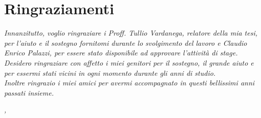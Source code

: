 
\cleardoublepage
{}
{}

\begingroup
\let\clearpage\relax
\let\cleardoublepage\relax
\let\cleardoublepage\relax

\chapter*{Ringraziamenti}

\noindent \textit{Innanzitutto, voglio ringraziare i Proff. Tullio Vardanega, relatore della mia tesi, per l'aiuto e il sostegno fornitomi durante lo svolgimento del lavoro e Claudio Enrico Palazzi, per essere stato disponibile ad approvare l'attività di stage.}\\

\noindent \textit{Desidero ringraziare con affetto i miei genitori per il sostegno, il grande aiuto e per essermi stati vicini in ogni momento durante gli anni di studio.}\\

\noindent \textit{Inoltre ringrazio i miei amici per avermi accompagnato in questi bellissimi anni passati insieme.}\\
\bigskip

\noindent\textit{\myLocation, \myTime}
\hfill \myName

\endgroup

